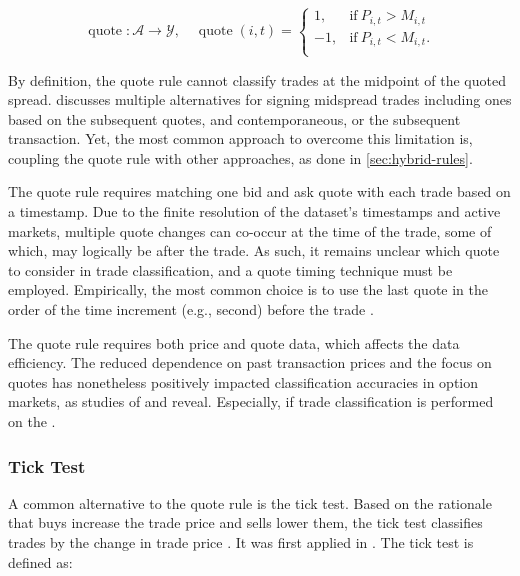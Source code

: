 \begin{equation}
    \operatorname{quote}\colon \mathcal{A} \to \mathcal{Y},\quad
    \operatorname{quote}(i, t)=
    \begin{cases}
        1,  & \text{if}\ P_{i, t}>M_{i, t}  \\
        -1, & \text{if}\ P_{i, t}<M_{i, t}. \\
    \end{cases}
\end{equation}

By definition, the quote rule cannot classify trades at the midpoint of the quoted spread. \textcite[][241]{hasbrouckTradesQuotesInventories1988} discusses multiple alternatives for signing midspread trades including ones based on the subsequent quotes, and contemporaneous, or the subsequent transaction. Yet, the most common approach to overcome this limitation is, coupling the quote rule with other approaches, as done in \cref{sec:hybrid-rules}.

The quote rule requires matching one bid and ask quote with each trade based on a timestamp. Due to the finite resolution of the dataset's timestamps and active markets, multiple quote changes can co-occur at the time of the trade, some of which, may logically be after the trade. As such, it remains unclear which quote to consider in trade classification, and a quote timing technique must be employed. Empirically, the most common choice is to use the last quote in the order of the time increment (e.g., second) before the trade \autocite[][1765]{holdenLiquidityMeasurementProblems2014}.

The quote rule requires both price and quote data, which affects the data efficiency. The reduced dependence on past transaction prices and the focus on quotes has nonetheless positively impacted classification accuracies in option markets, as studies of \textcite[][886]{savickasInferringDirectionOption2003} and \textcite[][3]{grauerOptionTradeClassification2022} reveal. Especially, if trade classification is performed on the .


\subsubsection{Tick Test}\label{sec:tick-test}

A common alternative to the quote rule is the tick test. Based on the rationale that buys increase the trade price and sells lower them, the tick test classifies trades by the change in trade price \autocite[][271]{easleyDiscerningInformationTrade2016}. It was first applied in \textcites[][244]{holthausenEffectLargeBlock1987}[][240]{hasbrouckTradesQuotesInventories1988}. The tick test is defined as:

